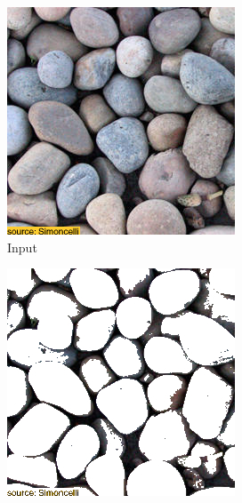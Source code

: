 \begin{figure}[]
\begin{subfigure}{\textwidth}
        \begin{subfigure}{0.24\textwidth}
            \centering
            \includegraphics[width=\textwidth]{images/04-experiment01/pebbles/target.jpg}
            \caption*{Input}
        \end{subfigure}
        \hfill
        \begin{subfigure}{0.24\textwidth}
            \centering
            \includegraphics[width=\textwidth]{images/04-experiment01/pebbles/threshold_bg.jpg}

\end{subfigure}
\end{subfigure}
\end{figure}
